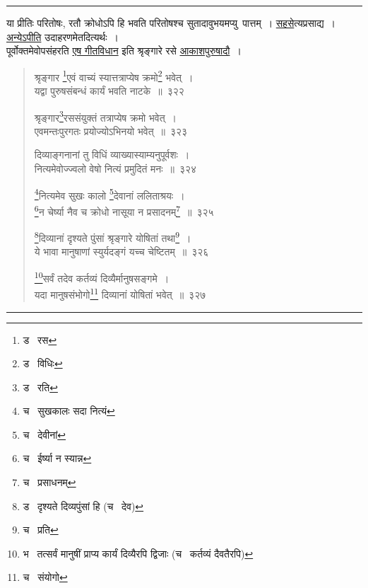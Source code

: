 \documentclass[11pt, openany]{book}
\begin{document}
\hrule

\vspace{2mm}
\noindent
या प्रीतिः परितोषः, रतौ क्रोधोऽपि हि भवति परितोषश्च सुतादावुभयमप्यु\textendash\ पात्तम्~। \underline{सहसे}त्यप्रसाद्य~। \underline{अन्येऽपीति} उदाहरणमेतदित्यर्थः~।\\

पूर्वोक्तमेवोपसंहरति \underline{एष गीतविधान} इति श्रृङ्गारे रसे \underline{आकाशपुरुषादौ}~।

\newpage

\begin{quote}
{\na श्रृङ्गार \renewcommand{\thefootnote}{1}\footnote{ड \textendash\  रस}एवं वाच्यं स्यात्तत्राप्येष क्रमो\renewcommand{\thefootnote}{2}\footnote{ड \textendash\  विधिः} भवेत्~।\\
यद्वा पुरुषसंबन्धं कार्यं भवति नाटके~॥~३२२

श्रृङ्गार\renewcommand{\thefootnote}{3}\footnote{ड \textendash\  रति}रससंयुक्तं तत्राप्येष क्रमो भवेत्~।\\
एवमन्तःपुरगतः प्रयोज्योऽभिनयो भवेत्~॥~३२३

दिव्याङ्गनानां तु विधिं व्याख्यास्याम्यनुपूर्वशः~।\\
नित्यमेवोज्ज्वलो वेषो नित्यं प्रमुदितं मनः~॥~३२४

\renewcommand{\thefootnote}{4}\footnote{च \textendash\  सुखकालः सदा नित्यं}नित्यमेव सुखः कालो \renewcommand{\thefootnote}{5}\footnote{च \textendash\  देवीनां}देवानां ललिताश्रयः~।\\
\renewcommand{\thefootnote}{6}\footnote{च \textendash\  ईर्ष्या न स्यान्न}न चेर्ष्या नैव च क्रोधो नासूया न प्रसादनम्\renewcommand{\thefootnote}{7}\footnote{च \textendash\  प्रसाधनम्}~॥~३२५

\renewcommand{\thefootnote}{8}\footnote{ड \textendash\  दृश्यते दिव्यपुंसां हि (च \textendash\  देव)}दिव्यानां दृश्यते पुंसां श्रृङ्गारे योषितां तथा\renewcommand{\thefootnote}{9}\footnote{च \textendash\  प्रति}~।\\
ये भावा मानुषाणां स्युर्यदङ्गं यच्च चेष्टितम्~॥~३२६

\renewcommand{\thefootnote}{10}\footnote{भ \textendash\  तत्सर्वं मानुषीं प्राप्य कार्यं दिव्यैरपि द्विजाः (च \textendash\  कर्तव्यं दैवतैरपि)}सर्वं तदेव कर्तव्यं दिव्यैर्मानुषसङ्गमे~।\\
यदा मानुषसंभोगो\renewcommand{\thefootnote}{11}\footnote{च \textendash\  संयोगो} दिव्यानां योषितां भवेत्~॥~३२७}
\end{quote}

\hrule
\end{document}
